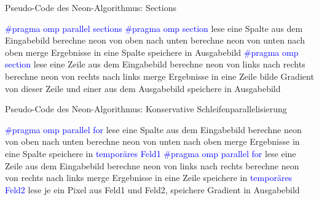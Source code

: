 \newpage
\begin{algorithm}[H]
\caption{Pseudo-Code des \glqq Neon\grqq-Algorithmus: Sections}
\label{algo:neon_sections}
\begin{algorithmic}[1]
\State \textcolor{blue}{\#pragma omp parallel sections}
\State \textcolor{blue}{\#pragma omp section}
	\State lese eine Spalte aus dem Eingabebild
		\State berechne neon von oben nach unten
	\EndFor
		\State berechne neon von unten nach oben
	\EndFor
	\State merge Ergebnisse in eine Spalte
	\State speichere in Ausgabebild
\EndFor	
\State \textcolor{blue}{\#pragma omp section}
	\State lese eine Zeile aus dem Eingabebild
		\State berechne neon von links nach rechts
	\EndFor
		\State berechne neon von rechts nach links
	\EndFor	
	\State merge Ergebnisse in eine Zeile
	\State bilde Gradient von dieser Zeile und einer aus dem Ausgabebild
	\State speichere in Ausgabebild
\EndFor
\end{algorithmic}
\end{algorithm}

\begin{algorithm}[H]
\caption{Pseudo-Code des \glqq Neon\grqq-Algorithmus: Konservative Schleifenparallelisierung}
\label{algo:neon_conservative}
\begin{algorithmic}[1]
\State \textcolor{blue}{\#pragma omp parallel for }
	\State lese eine Spalte aus dem Eingabebild
		\State berechne neon von oben nach unten
	\EndFor
		\State berechne neon von unten nach oben
	\EndFor
	\State merge Ergebnisse in eine Spalte
	\State speichere in \textcolor{blue}{temporäres Feld1}
\EndFor	
\State \textcolor{blue}{\#pragma omp parallel for }
	\State lese eine Zeile aus dem Eingabebild
		\State berechne neon von links nach rechts
	\EndFor
		\State berechne neon von rechts nach links
	\EndFor	
	\State merge Ergebnisse in eine Zeile
	\State speichere in \textcolor{blue}{temporäres Feld2}
\EndFor
{}
	\State \label{neon_keine_datenabhaengigkeit} lese je ein Pixel aus Feld1 und Feld2,  speichere Gradient in Ausgabebild
\EndFor
\end{algorithmic}
\end{algorithm}




